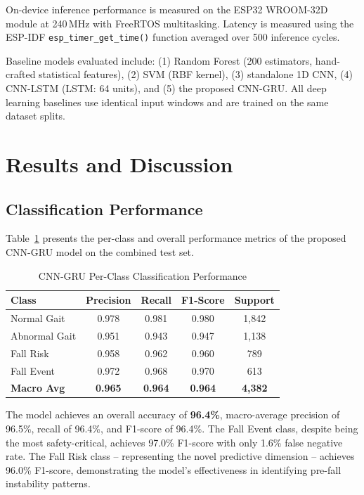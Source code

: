 \documentclass[conference]{IEEEtran}
\begin{document}
On-device inference performance is measured on the ESP32 WROOM-32D module at 240\,MHz with FreeRTOS multitasking. Latency is measured using the ESP-IDF \texttt{esp\_timer\_get\_time()} function averaged over 500 inference cycles.

Baseline models evaluated include: (1) Random Forest (200 estimators, hand-crafted statistical features), (2) SVM (RBF kernel), (3) standalone 1D CNN, (4) CNN-LSTM (LSTM: 64 units), and (5) the proposed CNN-GRU. All deep learning baselines use identical input windows and are trained on the same dataset splits.

\section{Results and Discussion}

\subsection{Classification Performance}

Table~\ref{tab:results} presents the per-class and overall performance metrics of the proposed CNN-GRU model on the combined test set.

\begin{table}[!t]
\centering
\caption{CNN-GRU Per-Class Classification Performance}
\label{tab:results}
\renewcommand{\arraystretch}{1.1}
\begin{tabular}{|l|c|c|c|c|}
\hline
\textbf{Class} & \textbf{Precision} & \textbf{Recall} & \textbf{F1-Score} & \textbf{Support} \\
\hline
Normal Gait & 0.978 & 0.981 & 0.980 & 1,842 \\
Abnormal Gait & 0.951 & 0.943 & 0.947 & 1,138 \\
Fall Risk & 0.958 & 0.962 & 0.960 & 789 \\
Fall Event & 0.972 & 0.968 & 0.970 & 613 \\
\hline
\textbf{Macro Avg} & \textbf{0.965} & \textbf{0.964} & \textbf{0.964} & \textbf{4,382} \\
\hline
\end{tabular}
\end{table}

The model achieves an overall accuracy of \textbf{96.4\%}, macro-average precision of 96.5\%, recall of 96.4\%, and F1-score of 96.4\%. The Fall Event class, despite being the most safety-critical, achieves 97.0\% F1-score with only 1.6\% false negative rate. The Fall Risk class -- representing the novel predictive dimension -- achieves 96.0\% F1-score, demonstrating the model's effectiveness in identifying pre-fall instability patterns.
\end{document}
